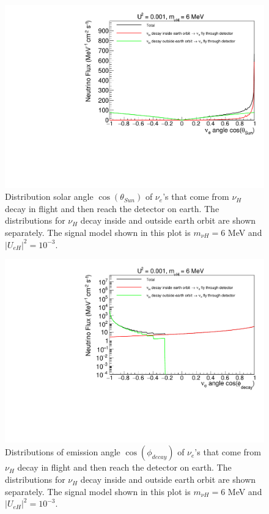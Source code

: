 \documentclass[%
 reprint,
 amsmath,amssymb,
 aps,
 prd,
floatfix,
twocolumn,
]{revtex4-1}
\begin{document}
\begin{figure}[!htbp]
\includegraphics[width=0.99\columnwidth]{../plots/DecayInFlightNuLCosthetaSun_U0.001_M6.0_InsideOutside_linXlinY.pdf}
\caption{Distribution solar angle $\cos(\theta_{Sun})$ of $\nu_e$'s that come from $\nu_H$ decay in flight and then reach the detector on earth. The distributions for $\nu_H$ decay inside and outside earth orbit are shown separately. The signal model shown in this plot is $m_{\nu H} = 6$ MeV and $|U_{eH}|^2 = 10^{-3}$.}
\label{fig:DecayInFlightTheta_U0.001_M6} 
\end{figure}


\begin{figure}[!htbp]
\includegraphics[width=0.99\columnwidth]{../plots/DecayInFlightNuLCosphiSun_U0.001_M6.0_InsideOutside_linXlogY.pdf}
\caption{Distributions of emission angle $\cos(\phi_{decay})$ of $\nu_e$'s that come from $\nu_H$ decay in flight and then reach the detector on earth. The distributions for $\nu_H$ decay inside and outside earth orbit are shown separately. The signal model shown in this plot is $m_{\nu H} = 6$ MeV and $|U_{eH}|^2 = 10^{-3}$.}
\label{fig:DecayInFlightPhi_U0.001_M6} 
\end{figure}
\end{document}
